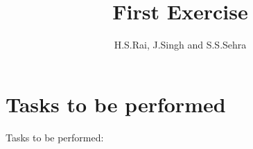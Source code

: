 \documentclass[12pt, letterpaper, twoside]{article}
\title{First Exercise}
\author{H.S.Rai, J.Singh and S.S.Sehra}
\date{}
\begin{document}
\maketitle
\section*{Tasks to be performed}
Tasks to be performed:
%
%
%
% 
\end{document}
